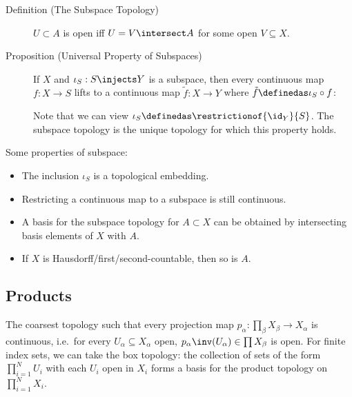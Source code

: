 \begin{description}
\item[Definition (The Subspace Topology)]
\(U\subset A\) is open iff \(U = V\intersect A\) for some open
\(V\subseteq X\).
\item[Proposition (Universal Property of Subspaces)]
If \(X\) and \(\iota_S: S\injects Y\) is a subspace, then every
continuous map \(f: X\to S\) lifts to a continuous map
\(\tilde f: X\to Y\) where \(\tilde f \definedas \iota_S \circ f\):

\begin{center}
\end{center}

Note that we can view \(\iota_S \definedas \restrictionof{\id_Y}{S}\).
The subspace topology is the unique topology for which this property
holds.
\end{description}

Some properties of subspace:

\begin{itemize}
\tightlist
\item
  The inclusion \(\iota_S\) is a topological embedding.
\item
  Restricting a continuous map to a subspace is still continuous.
\item
  A basis for the subspace topology for \(A\subset X\) can be obtained
  by intersecting basis elements of \(X\) with \(A\).
\item
  If \(X\) is Hausdorff/first/second-countable, then so is \(A\).
\end{itemize}

\hypertarget{products}{%
\subsection{Products}\label{products}}

\begin{description}
\tightlist
\item[Definition (The Product Topology)]
The coarsest topology such that every projection map
\(p_\alpha: \prod_\beta X_\beta \to X_\alpha\) is continuous, i.e.~for
every \(U_\alpha \subseteq X_\alpha\) open,
\(p_\alpha\inv(U_\alpha)\in \prod X_\beta\) is open. For finite index
sets, we can take the box topology: the collection of sets of the form
\(\prod_{i=1}^N U_i\) with each \(U_i\) open in \(X_i\) forms a basis
for the product topology on \(\prod_{i=1}^N X_i\).
\end{description}

